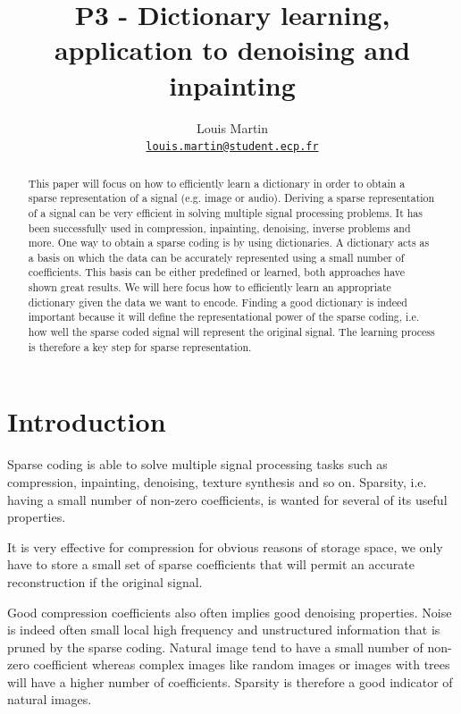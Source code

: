\documentclass[a4paper,11pt]{article}
\title{P3 - Dictionary learning, application to denoising and inpainting}
\author{
  Louis Martin\\
  \href{mailto:louis.martin@student.ecp.fr}{\tt louis.martin@student.ecp.fr}
}
\begin{document}
\maketitle

\begin{abstract}
This paper will focus on how to efficiently learn a dictionary in order to obtain a sparse representation of a signal (e.g. image or audio).
Deriving a sparse representation of a signal can be very efficient in solving multiple signal processing problems.
It has been successfully used in compression, inpainting, denoising, inverse problems and more.
One way to obtain a sparse coding is by using dictionaries.
A dictionary acts as a basis on which the data can be accurately represented using a small number of coefficients.
This basis can be either predefined or learned, both approaches have shown great results.
We will here focus how to efficiently learn an appropriate dictionary given the data we want to encode.
Finding a good dictionary is indeed important because it will define the representational power of the sparse coding,
i.e. how well the sparse coded signal will represent the original signal.
The learning process is therefore a key step for sparse representation.

\end{abstract}

\section{Introduction}
Sparse coding is able to solve multiple signal processing tasks such as compression, inpainting, denoising, texture synthesis and so on.
Sparsity, i.e. having a small number of non-zero coefficients, is wanted for several of its useful properties.

It is very effective for compression for obvious reasons of storage space, we only have to store a small set of sparse coefficients that will permit an accurate reconstruction if the original signal.

Good compression coefficients also often implies good denoising properties.
Noise is indeed often small local high frequency and unstructured information that is pruned by the sparse coding.
Natural image tend to have a small number of non-zero coefficient whereas complex images like random images or images with trees will have a higher number of coefficients.
Sparsity is therefore a good indicator of natural images.
\end{document}
